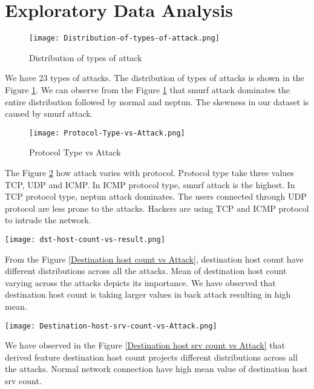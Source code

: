 \documentclass{acm_proc_article-sp}
\begin{document}
\section{Exploratory Data Analysis}
\begin{figure}[h]
\texttt{[image: Distribution-of-types-of-attack.png]}
\centering
\caption{Distribution of types of attack}
\label{Distribution of types of attack}
\end{figure}
We have 23 types of attacks. The distribution of types of attacks is shown in the Figure \ref{Distribution of types of attack}. We can observe from the Figure  \ref{Distribution of types of attack} that smurf attack dominates the entire distribution followed by normal  and neptun. The skewness in our dataset is caused by smurf attack.


\begin{figure}[h]
\texttt{[image: Protocol-Type-vs-Attack.png]}
\centering
\caption{Protocol Type vs Attack}
\label{Protocol Type vs Attack}
\end{figure}
The Figure \ref{Protocol Type vs Attack} how attack varies with protocol. Protocol type take three values TCP, UDP and ICMP. In ICMP protocol type, smurf attack is the highest. In TCP protocol type, neptun attack dominates. The users connected through UDP protocol are less prone to the attacks. Hackers are using TCP and ICMP protocol to intrude the network.

\begin{figure*}[h]
\texttt{[image: dst-host-count-vs-result.png]}
\centering
\caption{Destination host count vs Attack}
\label{Destination host count vs Attack}
\end{figure*}
From the Figure \ref{Destination host count vs Attack}, destination host count have different distributions across all the attacks. Mean of destination host count varying across the attacks depicts its importance. We have observed that destination host count is taking larger values in back attack resulting in high mean.

\begin{figure*}[h]
\texttt{[image: Destination-host-srv-count-vs-Attack.png]}
\centering
\caption{Destination host srv count vs Attack}
\label{Destination host srv count vs Attack}
\end{figure*}
We have observed in the Figure \ref{Destination host srv count vs Attack} that derived feature destination host count projects different distributions across all the attacks. Normal network connection have high mean value of destination host srv count.
\end{document}
